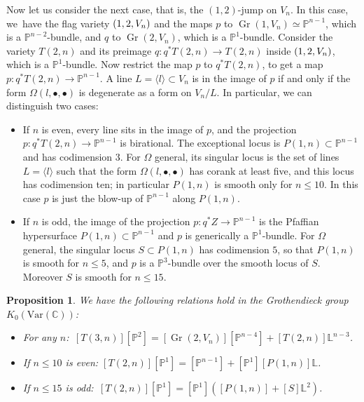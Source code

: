 \documentclass[11pt]{article}
\newcommand{\NoChangel}[1]{%
\expandafter\let\csname old\string#1\endcsname=#1
\let#1=\relax
\newcommand{#1}{\mathcode`l="716C\csname old\string#1\endcsname\mathcode`l="7160 }%
}
\newcommand{\sbullet}{{\scriptstyle\bullet}}
\newcommand{\Var}{\mathrm{Var}}
\theoremstyle{plain}
\newtheorem{prop}[theorem]{Proposition}
\theoremstyle{definition}
\newcommand{\sod}[1]{\langle #1 \rangle}
\DeclareMathOperator{\Gr}{Gr}
\DeclareMathOperator{\Fl}{Fl}\NoChangel{\Fl}
\newcommand{\CC}{\mathbb{C}}
\newcommand{\LL}{\mathbb{L}}
\newcommand{\PP}{\mathbb{P}}
\begin{document}
Now let us consider the next case, that is, the $(1,2)$-jump on $V_n$. In this case, we~have the flag variety $\Fl(1,2,V_n)$ and the maps $p$ to $\Gr(1,V_n)\simeq \PP^{n-1}$, which is a $\PP^{n-2}$-bundle, and $q$ to $\Gr(2,V_n)$, which is a $\PP^1$-bundle. Consider the variety $T(2,n)$ and its preimage $q: q^*T(2,n) \to T(2,n)$ inside $\Fl(1,2,V_n)$, which is a $\PP^1$-bundle. Now restrict the map $p$ to $q^*T(2,n)$, to get a map $p: q^*T(2,n) \to \PP^{n-1}$. A line $L = \sod{l} \subset V_n$ is in the image of $p$ if and only if the form $\Omega(l,\sbullet,\sbullet)$ is degenerate as a form on $V_n/L$. In particular, we can distinguish two cases:

\begin{itemize}
\item If $n$ is even, every line sits in the image of $p$, and the projection $p: q^*T(2,n) \to \PP^{n-1}$ is birational. The exceptional locus is $P(1,n) \subset \PP^{n-1}$ and has codimension $3$. For $\Omega$ general, its singular locus is the set of lines $L = \sod{l}$ such that
the form $\Omega(l,\sbullet,\sbullet)$ has corank at least five, and this locus has codimension ten; in particular $P(1,n)$ is smooth only for $n\le 10$. In this case $p$ is just the blow-up of $\PP^{n-1}$ along $P(1,n)$.
\item If $n$ is odd, the image of the projection $p: q^*Z \to \PP^{n-1}$ is the Pfaffian
hypersurface $P(1,n) \subset \PP^{n-1}$ and $p$ is generically a $\PP^1$-bundle.
For $\Omega$ general, the singular locus $S \subset P(1,n)$ has codimension $5$, so
that $P(1,n)$ is smooth for $n \leq 5$, and $p$ is a $\PP^3$-bundle over the smooth
locus of $S$. Moreover $S$ is smooth for $n\le 15$.
\end{itemize}

\begin{prop}\label{prop:jump-T2-to-T3}
We have the following relations hold in the Grothendieck group $K_0(\Var(\CC))$:\vspace*{-3pt}
\begin{itemize}
\item For any $n$:\qquad\quad\;\,
$[T(3,n)][\PP^2]=[\Gr(2,V_n)][\PP^{n-4}]+[T(2,n)]\LL^{n-3}$.

\item If $n\le 10$ is even:\quad
$[T(2,n)][\PP^1]=[\PP^{n-1}]+[\PP^1][P(1,n)]\LL$.

\item If $n\le 15$ is odd:\quad\,
$[T(2,n)][\PP^1]=[\PP^1]([P(1,n)]+[S]\LL^2)$.
\end{itemize}
\end{prop}
\end{document}
